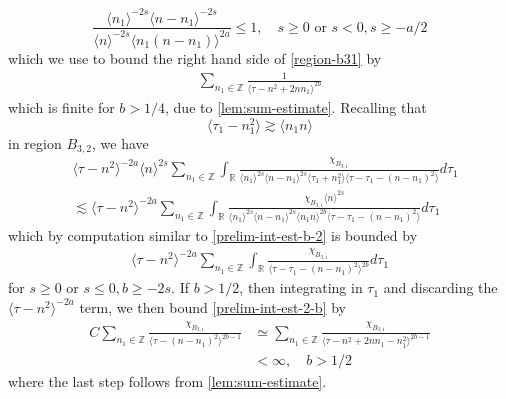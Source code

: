 \documentclass[12pt,reqno]{amsart}
\numberwithin{equation}{section}  %
\numberwithin{figure}{section}
\newcommand{\rr}{\mathbb{R}}
\newcommand{\zz}{\mathbb{Z}}
\theoremstyle{plain}
\theoremstyle{definition}
\theoremstyle{remark}
\begin{document}
%
\begin{equation*}
\frac{\langle n_1 \rangle ^{-2s} \langle n - n_{1} \rangle ^{-2s}}{\langle
n \rangle ^{-2s} \langle n_{1}(n - n_{1}) \rangle
^{2a}} \le 1, \quad s \ge 0 \text{ or } s<0, s \ge -a/2 
\end{equation*}
%
%
which we use to bound the right hand side of \eqref{region-b31} by
%
%
\begin{equation*}
\begin{split}
\sum_{n_{1} \in
\zz} 
\frac{1}{\langle \tau - n^{2} + 2nn_{1}  \rangle ^{2b}}
\end{split}
\end{equation*}
%
%
%
which is finite for $b > 1/4$, due to \autoref{lem:sum-estimate}.
Recalling that 
$$ \langle \tau_{1} - n_{1}^{2} \rangle
\gtrsim \langle n_{1}n \rangle$$
%
in region $B_{3,2}$, we have
%
%
\begin{equation*}
\begin{split}
& \langle \tau - n^{2}  \rangle ^{-2a} \langle n
    \rangle ^{2s}
    \sum_{n_{1} \in \zz} \int_{\rr} \frac{\chi_{B_{3,1}}}{ \langle n_{1} \rangle ^{2s} \langle n-n_{1} \rangle ^{2s} 
\langle \tau_{1} + n_{1}^{2}  \rangle \langle  \tau - \tau_{1} - (n -
n_{1})^{2}  \rangle}
d \tau_1 
\\
& \lesssim \langle \tau - n^{2}  \rangle ^{-2a}     \sum_{n_{1} \in \zz} \int_{\rr} \frac{\chi_{B_{3,1}} \langle n
    \rangle ^{2s}
}{ \langle n_{1} \rangle ^{2s} \langle n-n_{1} \rangle ^{2s} 
\langle n_{1}n \rangle ^{2b} \langle  \tau - \tau_{1} - (n -
n_{1})^{2}  \rangle}
d \tau_1 
\end{split}
\end{equation*}
%
%
which by computation similar to \eqref{prelim-int-est-b-2}
is bounded by
%
%
\begin{equation}
  \label{prelim-int-est-2-b}
\begin{split}
\langle \tau - n^{2}  \rangle ^{-2a} \sum_{n_{1} \in \zz} \int_{\rr} \frac{\chi_{B_{3,1}} }{ \langle  \tau - \tau_{1} - (n -
n_{1})^{2}  \rangle^{2b}}
d \tau_1 
\end{split}
\end{equation}
%
%
for $s \ge 0$ or $s \le 0, b \ge -2s$. If $b > 1/2$, then integrating in
$\tau_{1}$ and discarding the  $\langle \tau - n^{2}  \rangle ^{-2a}$ term, we
then bound \eqref{prelim-int-est-2-b} by
%
%
\begin{equation*}
\begin{split}
  C \sum_{n_{1} \in \zz} \frac{\chi_{B_{3,1}}}{\langle \tau - (n -
  n_{1})^{2} \rangle ^{2b -1}}
  & \simeq
  \sum_{n_{1} \in \zz} \frac{\chi_{B_{3,1}}}{\langle \tau - n^{2} +
  2nn_{1} - n_{1}^{2}
  \rangle ^{2b -1}}
  \\
  & < \infty, \quad b > 1/2
\end{split}
\end{equation*}
%
%
where the last step follows from  \autoref{lem:sum-estimate}.
\end{document}
